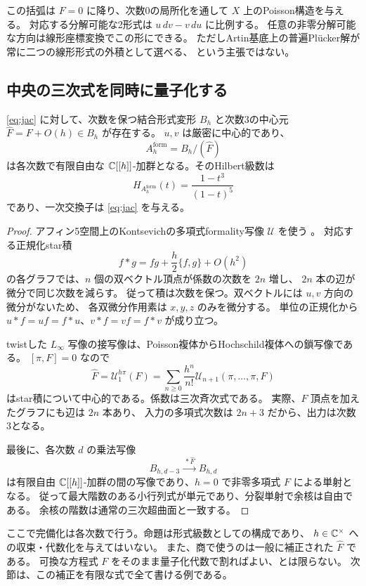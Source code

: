 この括弧は $F=0$ に降り、次数0の局所化を通して $X$ 上のPoisson構造を与える。
対応する分解可能な2形式は $u\,dv-v\,du$ に比例する。
任意の非零分解可能な方向は線形座標変換でこの形にできる。
ただしArtin基底上の普遍Plücker解が常に二つの線形形式の外積として選べる、
という主張ではない。

\subsection{中央の三次式を同時に量子化する}

\begin{theorem}[各Poisson方向の形式的な次数付きモデル]\label{thm:formalgraded}
\eqref{eq:jac} に対して、次数を保つ結合形式変形 $B_h$ と次数3の中心元
$\widehat F=F+O(h)\in B_h$ が存在する。
$u,v$ は厳密に中心的であり、
\[
 A_h^{\mathrm{form}}=B_h/(\widehat F)
\]
は各次数で有限自由な $\mathbb C[[h]]$-加群となる。そのHilbert級数は
\[
 H_{A_h^{\mathrm{form}}}(t)=\frac{1-t^3}{(1-t)^5}
\]
であり、一次交換子は \eqref{eq:jac} を与える。
\end{theorem}

\begin{proof}
アフィン5空間上のKontsevichの多項式formality写像 $\mathcal U$ を使う
\cite[Sections 4.6, 6, 8]{Kon}。
対応する正規化star積
\[
 f*g=fg+\frac h2\{f,g\}+O(h^2)
\]
の各グラフでは、$n$ 個の双ベクトル頂点が係数の次数を $2n$ 増し、
$2n$ 本の辺が微分で同じ次数を減らす。
従って積は次数を保つ。双ベクトルには $u,v$ 方向の微分がないため、
各双微分作用素は $x,y,z$ のみを微分する。
単位の正規化から $u*f=uf=f*u$、$v*f=vf=f*v$ が成り立つ。

twistした $L_\infty$ 写像の接写像は、Poisson複体からHochschild複体への鎖写像である。
$[\pi,F]=0$ なので
\[
 \widehat F=\mathcal U^{h\pi}_1(F)
 =\sum_{n\ge0}\frac{h^n}{n!}\mathcal U_{n+1}(\pi,\ldots,\pi,F)
\]
はstar積について中心的である。係数は三次斉次式である。
実際、$F$ 頂点を加えたグラフにも辺は $2n$ 本あり、
入力の多項式次数は $2n+3$ だから、出力は次数3となる。

最後に、各次数 $d$ の乗法写像
\[
 B_{h,d-3}\xrightarrow{\ *\widehat F\ }B_{h,d}
\]
は有限自由 $\mathbb C[[h]]$-加群の間の写像であり、$h=0$ で非零多項式 $F$ による単射となる。
従って最大階数のある小行列式が単元であり、分裂単射で余核は自由である。
余核の階数は通常の三次超曲面と一致する。
\end{proof}

ここで完備化は各次数で行う。命題は形式級数としての構成であり、
$h\in\mathbb C^\times$ への収束・代数化を与えてはいない。
また、商で使うのは一般に補正された $\widehat F$ である。
可換な方程式 $F$ をそのまま量子化代数で割ればよい、とは限らない。
次節は、この補正を有限な式で全て書ける例である。

